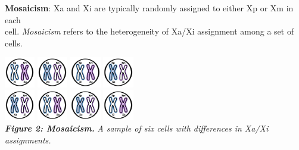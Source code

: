 \documentclass[
]{article}
\begin{document}
\textbf{Mosaicism}: Xa and Xi are typically randomly assigned to either
Xp or Xm in each\\
cell. \emph{Mosaicism} refers to the heterogeneity of Xa/Xi assignment
among a set of cells.

\includegraphics[width=0.1\textwidth,height=\textheight]{images/XCI-images/Slide5.png}
\includegraphics[width=0.1\textwidth,height=\textheight]{images/XCI-images/Slide6.png}
\includegraphics[width=0.1\textwidth,height=\textheight]{images/XCI-images/Slide5.png}
\includegraphics[width=0.1\textwidth,height=\textheight]{images/XCI-images/Slide6.png}\\
\includegraphics[width=0.1\textwidth,height=\textheight]{images/XCI-images/Slide6.png}
\includegraphics[width=0.1\textwidth,height=\textheight]{images/XCI-images/Slide5.png}
\includegraphics[width=0.1\textwidth,height=\textheight]{images/XCI-images/Slide6.png}
\includegraphics[width=0.1\textwidth,height=\textheight]{images/XCI-images/Slide5.png}\\
\textbf{\emph{Figure 2: Mosaicism.}} \emph{A sample of six cells with
differences in Xa/Xi assignments.}\\
\end{document}
